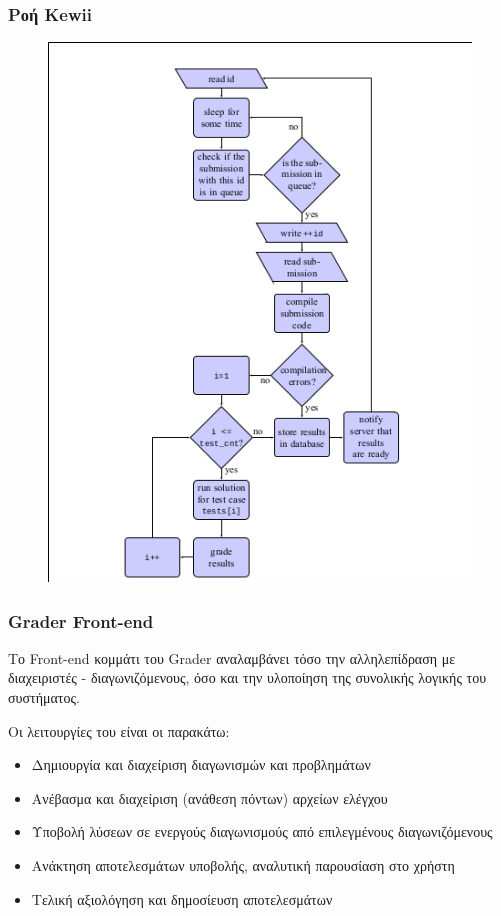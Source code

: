 \documentclass{beamer}
\begin{document}
\begin{frame}
  \frametitle{Ροή Kewii}

  \begin{figure}
    \includegraphics[scale=0.37,trim=4 4 4 4,clip]{../Figures/graderflow.png}
  \end{figure}
\end{frame}

\begin{frame}
  \frametitle{Grader Front-end}

  Το Front-end κομμάτι του Grader αναλαμβάνει τόσο την αλληλεπίδραση με
  διαχειριστές - διαγωνιζόμενους, όσο και την υλοποίηση της συνολικής λογικής
  του συστήματος.

  \bigskip

  Οι λειτουργίες του είναι οι παρακάτω:
  \begin{itemize}
      \item Δημιουργία και διαχείριση διαγωνισμών και προβλημάτων
      \item Ανέβασμα και διαχείριση (ανάθεση πόντων) αρχείων ελέγχου
      \item Υποβολή λύσεων σε ενεργούς διαγωνισμούς από επιλεγμένους διαγωνιζόμενους
      \item Ανάκτηση αποτελεσμάτων υποβολής, αναλυτική παρουσίαση στο χρήστη
      \item Τελική αξιολόγηση και δημοσίευση αποτελεσμάτων
  \end{itemize}
\end{frame}
\end{document}
